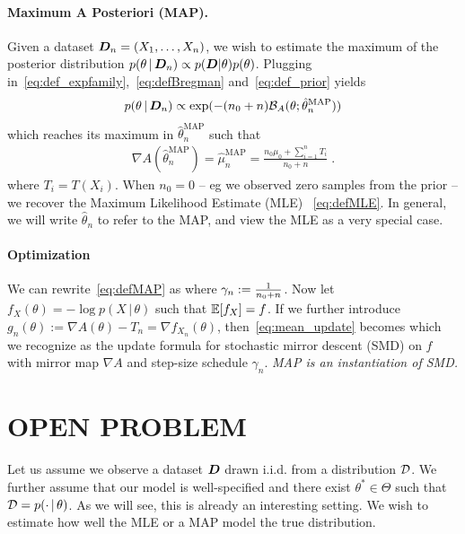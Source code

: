 \documentclass[twoside]{article}
\let\oldsection\section
\renewcommand{\section}[1]{\oldsection{\texorpdfstring{\uppercase{#1}}{#1}}}
\newcommand{\cond}{\,\vert\,}
\newcommand{\logpart}{A}
\newcommand{\conj}{\logpart^*}
\newcommand{\bregman}{\cB_\logpart}
\newcommand{\nat}{\theta}
\newcommand{\m}{\mu}
\newcommand{\meanp}{\m}
\newcommand{\lr}{\gamma} %
\newcommand{\MAPm}{\hat \m_n}
\newcommand{\MAPt}{\hat \nat_n}
\begin{document}
\paragraph{Maximum A Posteriori (MAP).} 
Given a dataset ${\bm{D}}_n =(X_1,\dots,X_n)$, we wish to estimate the maximum of the posterior distribution $p(\nat \cond \mD_n) \propto p(\mD|\nat)p(\nat)$.
Plugging in~\eqref{eq:def_expfamily},~\eqref{eq:defBregman} and~\eqref{eq:def_prior} yields
\begin{align}
	p(\nat \cond \mD_n)
    \propto \exp(- (n_0+n) \bregman(\nat; \MAPt^\text{MAP}))
    \label{eq:joint_likelihood}
\end{align}
which reaches its maximum in $\MAPt^\text{MAP}$ such that
\begin{align}
    \nabla \logpart(\MAPt^\text{MAP}) = \MAPm^\text{MAP}
    = \frac{n_0 \meanp_0 + \sum_{i=1}^n T_i}{n_0+n} \; .
    \label{eq:defMAP}
\end{align}
where $T_i=T(X_i)$.
When $n_0=0$ -- eg we observed zero samples from the prior -- we recover the Maximum Likelihood Estimate (MLE)~ \eqref{eq:defMLE}.
In general, we will write $\MAPt$ to refer to the MAP, and view the MLE as a very special case.

\paragraph{Optimization}
We can rewrite~\eqref{eq:defMAP} as
\alignn{
\m_n = \m_{n-1}- \lr_n (\m_{n-1} - T_n)
\label{eq:mean_update}
}
where $\lr_n := \inv{n_0 + n}$. 
Now let $f_X(\nat) = -\log p(X \cond \nat)$ such that $\operatorname{\mathbb{E}}[f_X] = f$.
If we further introduce $g_n(\nat) := \nabla\logpart(\nat) - T_n = \nabla f_{X_n}(\nat)$, then~\eqref{eq:mean_update} becomes
\alignn{
\nabla\conj(\hat \nat_{n}) 
= \nabla\conj(\hat \nat_{n-1}) - \lr_n g_n(\hat \nat_{n-1})
}
which we recognize as the update formula for stochastic mirror descent (SMD) on $f$ with mirror map $\nabla\logpart$ and step-size schedule $\lr_n$.
\emph{MAP is an instantiation of SMD.}

\section{Open Problem}
Let us assume we observe a dataset ${\bm{D}}$ drawn i.i.d. from a distribution ${\mathcal D}$.
We further assume that our model is well-specified and there exist $\nat^*\in\Theta$ such that $\cD = p(\cdot \cond \nat)$.
As we will see, this is already an interesting setting.
We wish to estimate how well the MLE or a MAP model the true distribution.
\end{document}
